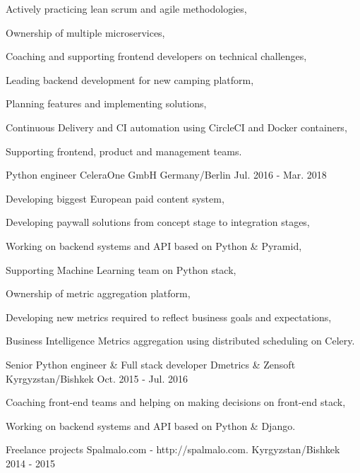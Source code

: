 \begin{cventries}
{\begin{cvitems}
        \item {Actively practicing lean scrum and agile methodologies,}
        \item {Ownership of multiple microservices,}
        \item {Coaching and supporting frontend developers on technical challenges,}
        \item {Leading backend development for new camping platform,}
        \item {Planning features and implementing solutions,}
        \item {Continuous Delivery and CI automation using CircleCI and Docker containers,}
        \item {Supporting frontend, product and management teams.}
      \end{cvitems}
    }
  \cventry
    {Python engineer}
    {CeleraOne GmbH}
    {Germany/Berlin}
    {Jul. 2016 - Mar. 2018}
    {
      \begin{cvitems}
        \item {Developing biggest European paid content system,}
        \item {Developing paywall solutions from concept stage to integration stages,}
        \item {Working on backend systems and API based on Python \& Pyramid,}
        \item {Supporting Machine Learning team on Python stack,}
        \item {Ownership of metric aggregation platform,}
        \item {Developing new metrics required to reflect business goals and expectations,}
        \item {Business Intelligence Metrics aggregation using distributed scheduling on Celery.}
      \end{cvitems}
    }
  \cventry
    {Senior Python engineer \& Full stack developer}
    {Dmetrics \& Zensoft}
    {Kyrgyzstan/Bishkek}
    {Oct. 2015 - Jul. 2016}
    {
      \begin{cvitems}
        \item {Coaching front-end teams and helping on making decisions on front-end stack,}
        \item {Working on backend systems and API based on Python \& Django.}
      \end{cvitems}
    }
  \cventry
    {Freelance projects}
    {Spalmalo.com - http://spalmalo.com.}
    {Kyrgyzstan/Bishkek}
    {2014 - 2015}
    {
      \begin{cvitems}

\end{cvitems}}
\end{cventries}

